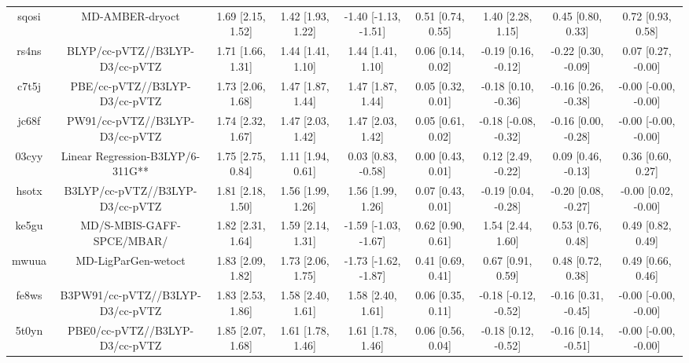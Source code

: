 \documentclass{article}
\begin{document}
\begin{center}
\begin{longtable}{|ccccccccc|}
 sqosi &                                    MD-AMBER-dryoct &  1.69 [2.15, 1.52] &  1.42 [1.93, 1.22] &  -1.40 [-1.13, -1.51] &  0.51 [0.74, 0.55] &     1.40 [2.28, 1.15] &     0.45 [0.80, 0.33] &     0.72 [0.93, 0.58] \\
 rs4ns &                     BLYP/cc-pVTZ//B3LYP-D3/cc-pVTZ &  1.71 [1.66, 1.31] &  1.44 [1.41, 1.10] &     1.44 [1.41, 1.10] &  0.06 [0.14, 0.02] &   -0.19 [0.16, -0.12] &   -0.22 [0.30, -0.09] &    0.07 [0.27, -0.00] \\
 c7t5j &                      PBE/cc-pVTZ//B3LYP-D3/cc-pVTZ &  1.73 [2.06, 1.68] &  1.47 [1.87, 1.44] &     1.47 [1.87, 1.44] &  0.05 [0.32, 0.01] &   -0.18 [0.10, -0.36] &   -0.16 [0.26, -0.38] &  -0.00 [-0.00, -0.00] \\
 jc68f &                     PW91/cc-pVTZ//B3LYP-D3/cc-pVTZ &  1.74 [2.32, 1.67] &  1.47 [2.03, 1.42] &     1.47 [2.03, 1.42] &  0.05 [0.61, 0.02] &  -0.18 [-0.08, -0.32] &   -0.16 [0.00, -0.28] &  -0.00 [-0.00, -0.00] \\
 03cyy &                   Linear Regression-B3LYP/6-311G** &  1.75 [2.75, 0.84] &  1.11 [1.94, 0.61] &    0.03 [0.83, -0.58] &  0.00 [0.43, 0.01] &    0.12 [2.49, -0.22] &    0.09 [0.46, -0.13] &     0.36 [0.60, 0.27] \\
 hsotx &                    B3LYP/cc-pVTZ//B3LYP-D3/cc-pVTZ &  1.81 [2.18, 1.50] &  1.56 [1.99, 1.26] &     1.56 [1.99, 1.26] &  0.07 [0.43, 0.01] &   -0.19 [0.04, -0.28] &   -0.20 [0.08, -0.27] &   -0.00 [0.02, -0.00] \\
 ke5gu &                          MD/S-MBIS-GAFF-SPCE/MBAR/ &  1.82 [2.31, 1.64] &  1.59 [2.14, 1.31] &  -1.59 [-1.03, -1.67] &  0.62 [0.90, 0.61] &     1.54 [2.44, 1.60] &     0.53 [0.76, 0.48] &     0.49 [0.82, 0.49] \\
 mwuua &                                MD-LigParGen-wetoct &  1.83 [2.09, 1.82] &  1.73 [2.06, 1.75] &  -1.73 [-1.62, -1.87] &  0.41 [0.69, 0.41] &     0.67 [0.91, 0.59] &     0.48 [0.72, 0.38] &     0.49 [0.66, 0.46] \\
 fe8ws &                   B3PW91/cc-pVTZ//B3LYP-D3/cc-pVTZ &  1.83 [2.53, 1.86] &  1.58 [2.40, 1.61] &     1.58 [2.40, 1.61] &  0.06 [0.35, 0.11] &  -0.18 [-0.12, -0.52] &   -0.16 [0.31, -0.45] &  -0.00 [-0.00, -0.00] \\
 5t0yn &                     PBE0/cc-pVTZ//B3LYP-D3/cc-pVTZ &  1.85 [2.07, 1.68] &  1.61 [1.78, 1.46] &     1.61 [1.78, 1.46] &  0.06 [0.56, 0.04] &   -0.18 [0.12, -0.52] &   -0.16 [0.14, -0.51] &  -0.00 [-0.00, -0.00] \\

\end{longtable}
\end{center}
\end{document}
